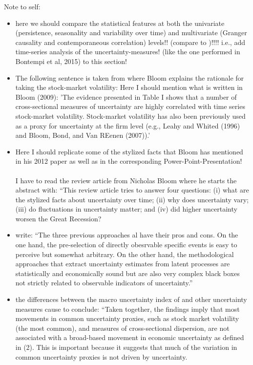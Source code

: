 \documentclass[a4paper,11pt,listof=nochaptergap,oneside,pointednumbers,bibtotoc,bigheadings,liststotoc]{scrbook}
\theoremstyle{mysatz}
\theoremstyle{mydefinition}
\theoremstyle{mybemerkung}
\begin{document}
\begingroup
    \fontsize{8pt}{12pt}\selectfont
    Note to self:
\begin{itemize}
	\item here we should compare the statistical features at both the univariate (persistence, seasonality and variability over time) and multivariate (Granger causality and contemporaneous correlation) levels!! (compare to \citet{bontempietal:16})!!!! i.e., add time-series analysis of the uncertainty-measures! (like the one performed in Bontempi et al, 2015) to this section!
	\item The following sentence is taken from \citet{bloom:09} where Bloom explains the rationale for taking the stock-market volatility: Here I should mention what is written in Bloom (2009): 'The evidence presented in Table I shows that a number of cross-sectional measures of uncertainty are highly correlated with time series stock-market volatility. Stock-market volatility has also been previously used as a proxy for uncertainty at the firm level (e.g., Leahy and Whited (1996) and Bloom, Bond, and Van REenen (2007)).'
	\item Here I should replicate some of the stylized facts that Bloom has mentioned in his 2012 paper as well as in the corresponding Power-Point-Presentation!\\
\\
I have to read the review article from Nicholas Bloom where he starts the abstract with: ``This review article tries to answer four questions: (i) what are the stylized facts about uncertainty over time; (ii) why does uncertainty vary; (iii) do fluctuations in uncertainty matter; and (iv) did higher uncertainty worsen the Great Recession?
	\item \citet[p. 3]{bontempietal:16} write: ``The three previous approaches al have their pros and cons. On the one hand, the pre-selection of directly obesrvable specific events is easy to perceive but somewhat arbitrary. On the other hand, the methodological approaches that extract uncertainty estimates from latent processes are statistically and economically sound but are also very complex black boxes not strictly related to observable indicators of uncertainty.''
	\item the differences between the macro uncertainty index of \citet{juradoetal:15} and other uncertainty measures cause \citet[p. 1180]{juradoetal:15} to conclude: ``Taken together, the findings imply that most movements in common uncertainty proxies, such as stock market volatility (the most common), and measures of cross-sectional dispersion, are not associated with a broad-based movement in economic uncertainty as defined in (2). This is important because it suggests that much of the variation in common uncertainty proxies is not driven by uncertainty.
\end{itemize}
\endgroup
\end{document}
